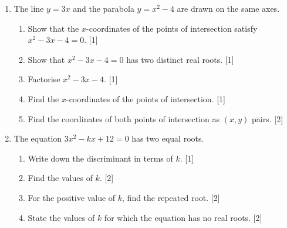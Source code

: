 \documentclass[12pt, twoside]{article}
\begin{document}
\begin{enumerate}[itemsep=0.15cm]
\newpage

\item[3.] [Maximum mark: 6]

The line $y = 3x$ and the parabola $y = x^2 - 4$ are drawn
on the same axes.

\begin{enumerate}[itemsep=0.15cm]
  \item Show that the $x$-coordinates of the points of intersection
  satisfy \\[0.25cm]
  $x^2 - 3x - 4 = 0$. \hfill [1]
  \item Show that $x^2 - 3x - 4=0$ has two distinct real roots. \hfill [1]
  \item Factorise $x^2 - 3x - 4$. \hfill [1]
  \item Find the $x$-coordinates of the points of intersection. \hfill [1]
  \item Find the coordinates of both points of intersection as $(x, y)$ pairs. \hfill [2]
\end{enumerate}


\newpage

\item[4.] [Maximum mark: 7]

The equation $3x^2 - kx + 12 = 0$ has two equal roots.

\begin{enumerate}[itemsep=0.15cm]
  \item Write down the discriminant in terms of $k$. \hfill [1]
  \item Find the values of $k$. \hfill [2]
  \item For the positive value of $k$, find the repeated root. \hfill [2]
  \item State the values of $k$ for which the equation has no
  real roots. \hfill [2]
\end{enumerate}


\end{enumerate}
\end{document}
